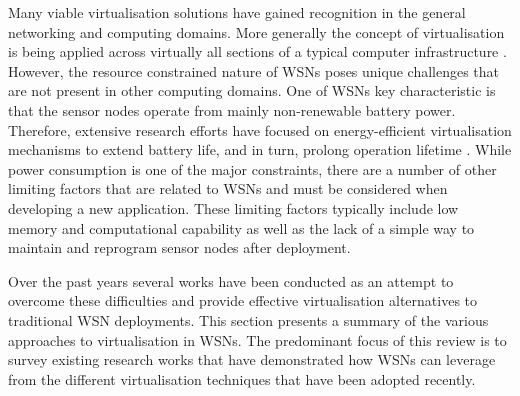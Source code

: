 Many viable virtualisation solutions have gained recognition in the general networking \cite{6272301} and computing \cite{6008687} domains. More generally the concept of virtualisation is being applied across virtually all sections of a typical computer infrastructure \cite{murphy2008virtualization}. However, the resource constrained nature of WSNs poses unique challenges that are not present in other computing domains. One of WSNs key characteristic is that the sensor nodes operate from mainly non-renewable battery power. Therefore, extensive research efforts have focused on energy-efficient virtualisation mechanisms to extend battery life, and in turn, prolong operation lifetime \cite{Hong:2012:TEE:2388871.2388872}.  While power consumption is one of the major constraints, there are a number of other limiting factors that are related to WSNs and must be considered when developing a new application.  These limiting factors typically include low memory and computational capability as well as the lack of a simple way to maintain and reprogram sensor nodes after deployment. 

Over the past years several works have been conducted as an attempt to overcome these difficulties and provide effective virtualisation alternatives to traditional WSN deployments. This section presents a summary of the various approaches to virtualisation in WSNs. The predominant focus of this review is to survey existing research works that have demonstrated how WSNs can leverage from the different virtualisation techniques that have been adopted recently. 


 